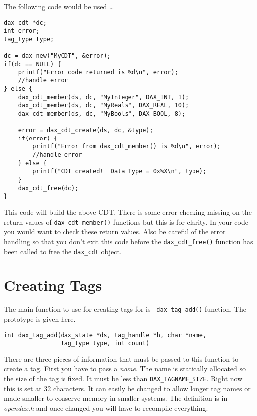 The following code would be used \ldots

\begin{verbatim}
dax_cdt *dc;
int error;
tag_type type;

dc = dax_new("MyCDT", &error);
if(dc == NULL) {
    printf("Error code returned is %d\n", error);
    //handle error
} else {
    dax_cdt_member(ds, dc, "MyInteger", DAX_INT, 1);
    dax_cdt_member(ds, dc, "MyReals", DAX_REAL, 10);
    dax_cdt_member(ds, dc, "MyBools", DAX_BOOL, 8);

    error = dax_cdt_create(ds, dc, &type);
    if(error) {
        printf("Error from dax_cdt_member() is %d\n", error);
	    //handle error
    } else {
        printf("CDT created!  Data Type = 0x%X\n", type);
    }
    dax_cdt_free(dc);
}

\end{verbatim}

This code will build the above CDT.  There is some error checking missing on the return values of \verb|dax_cdt_member()| functions but this is for clarity.  In your code you would want to check these return values.  Also be careful of the error handling so that you don't exit this code before the \verb|dax_cdt_free()| function has been called to free the \verb|dax_cdt| object.



\section{Creating Tags}
The main function to use for creating tags for \opendax is \verb| dax_tag_add()| function.  The prototype is given here.

\begin{verbatim}
int dax_tag_add(dax_state *ds, tag_handle *h, char *name,
                tag_type type, int count)
\end{verbatim}

There are three pieces of information that must be passed to this function to create a tag.  First you have to pass a \emph{name}.  The name is statically allocated so the size of the tag is fixed.  It must be less than \verb|DAX_TAGNAME_SIZE|.  Right now this is set at 32 characters.  It can easily be changed to allow longer tag names or made smaller to conserve memory in smaller systems.  The definition is in \emph{opendax.h} and once changed you will have to recompile everything.

